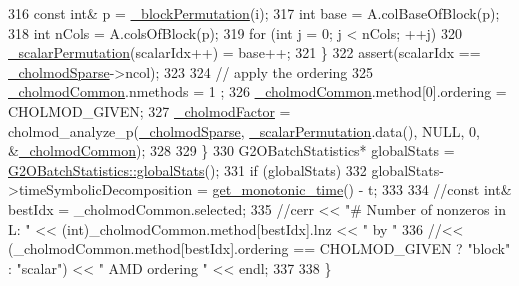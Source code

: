 \begin{DoxyCode}
316           \textcolor{keyword}{const} \textcolor{keywordtype}{int}& p = \hyperlink{classg2o_1_1LinearSolverCholmod_a6dc3dd0af697846996d6ca72da72ffbd}{\_blockPermutation}(i);
317           \textcolor{keywordtype}{int} base  = A.colBaseOfBlock(p);
318           \textcolor{keywordtype}{int} nCols = A.colsOfBlock(p);
319           \textcolor{keywordflow}{for} (\textcolor{keywordtype}{int} j = 0; j < nCols; ++j)
320             \hyperlink{classg2o_1_1LinearSolverCholmod_aa195d0f2a09641240e8ab7da8b516460}{\_scalarPermutation}(scalarIdx++) = base++;
321         \}
322         assert(scalarIdx == \hyperlink{classg2o_1_1LinearSolverCholmod_aefbdba58c18dc9eac831eb3d7c24fa18}{\_cholmodSparse}->ncol);
323 
324         \textcolor{comment}{// apply the ordering}
325         \hyperlink{classg2o_1_1LinearSolverCholmod_ae7def9c6bf341e0d2f3a3936121fefa1}{\_cholmodCommon}.nmethods = 1 ;
326         \hyperlink{classg2o_1_1LinearSolverCholmod_ae7def9c6bf341e0d2f3a3936121fefa1}{\_cholmodCommon}.method[0].ordering = CHOLMOD\_GIVEN;
327         \hyperlink{classg2o_1_1LinearSolverCholmod_a674a54287f98130c4aab303508ab945b}{\_cholmodFactor} = cholmod\_analyze\_p(\hyperlink{classg2o_1_1LinearSolverCholmod_aefbdba58c18dc9eac831eb3d7c24fa18}{\_cholmodSparse}, 
      \hyperlink{classg2o_1_1LinearSolverCholmod_aa195d0f2a09641240e8ab7da8b516460}{\_scalarPermutation}.data(), NULL, 0, &\hyperlink{classg2o_1_1LinearSolverCholmod_ae7def9c6bf341e0d2f3a3936121fefa1}{\_cholmodCommon});
328 
329       \}
330       G2OBatchStatistics* globalStats = \hyperlink{structg2o_1_1G2OBatchStatistics_a06f9c667d8b48b8f0023e27011818b64}{G2OBatchStatistics::globalStats}();
331       \textcolor{keywordflow}{if} (globalStats)
332         globalStats->timeSymbolicDecomposition = \hyperlink{namespaceg2o_aa64237935c7d8411b4369234a5f661ea}{get\_monotonic\_time}() - t;
333 
334       \textcolor{comment}{//const int& bestIdx = \_cholmodCommon.selected;}
335       \textcolor{comment}{//cerr << "# Number of nonzeros in L: " << (int)\_cholmodCommon.method[bestIdx].lnz << " by "}
336         \textcolor{comment}{//<< (\_cholmodCommon.method[bestIdx].ordering == CHOLMOD\_GIVEN ? "block" : "scalar") << " AMD
       ordering " << endl;}
337 
338     \}
\end{DoxyCode}
